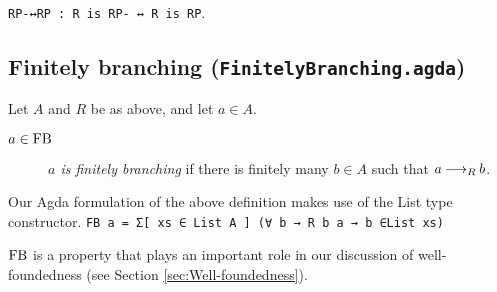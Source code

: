 \verb|RP-↔RP : R is RP- ↔ R is RP|. 

\subsection{Finitely branching (\texttt{FinitelyBranching.agda})}

\begin{definition} Let $A$ and $R$ be as above, and let $a \in A$.
    \begin{description}
        \item[$a \in \mathrm{FB}$] \emph{$a$ is finitely branching} if there is finitely many $b \in A$ such that $a \mathbin{\longrightarrow_R} b$.  
    \end{description}
\end{definition}

Our Agda formulation of the above definition makes use of the List type constructor. 
\verb|FB a = Σ[ xs ∈ List A ] (∀ b → R b a → b ∈List xs)|

$\mathrm{FB}$ is a property that plays an important role in our discussion of well-foundedness (see Section \ref{sec:Well-foundedness}).